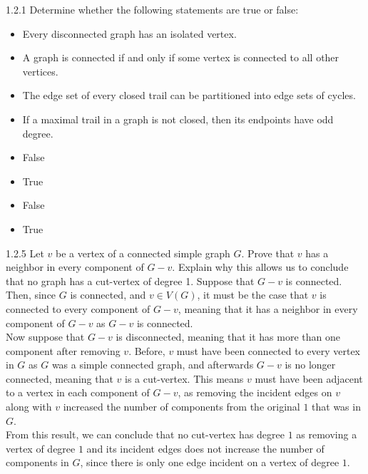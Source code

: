 \documentclass[10pt]{extarticle}
\title{}
\author{Avinash Iyer}
\date{}
\begin{document}
  \begin{problem}{1.2.1}
    Determine whether the following statements are true or false:
      \begin{itemize}
        \item Every disconnected graph has an isolated vertex.
        \item A graph is connected if and only if some vertex is connected to all other vertices.
        \item The edge set of every closed trail can be partitioned into edge sets of cycles.
        \item If a maximal trail in a graph is not closed, then its endpoints have odd degree.
      \end{itemize}
      \tcblower
        \begin{itemize}
          \item False
          \item True
          \item False
          \item True
        \end{itemize}
  \end{problem}
  \begin{problem}{1.2.5}
    Let $v$ be a vertex of a connected simple graph $G$. Prove that $v$ has a neighbor in every component of $G-v$. Explain why this allows us to conclude that no graph has a cut-vertex of degree 1.   
    \tcblower
    Suppose that $G-v$ is connected. Then, since $G$ is connected, and $v\in V(G)$, it must be the case that $v$ is connected to every component of $G-v$, meaning that it has a neighbor in every component of $G-v$ as $G-v$ is connected.\\

    Now suppose that $G-v$ is disconnected, meaning that it has more than one component after removing $v$. Before, $v$ must have been connected to every vertex in $G$ as $G$ was a simple connected graph, and afterwards $G-v$ is no longer connected, meaning that $v$ is a cut-vertex. This means $v$ must have been adjacent to a vertex in each component of $G-v$, as removing the incident edges on $v$ along with $v$ increased the number of components from the original $1$ that was in $G$.\\

    From this result, we can conclude that no cut-vertex has degree $1$ as removing a vertex of degree $1$ and its incident edges does not increase the number of components in $G$, since there is only one edge incident on a vertex of degree $1$.
  \end{problem}
\end{document}
